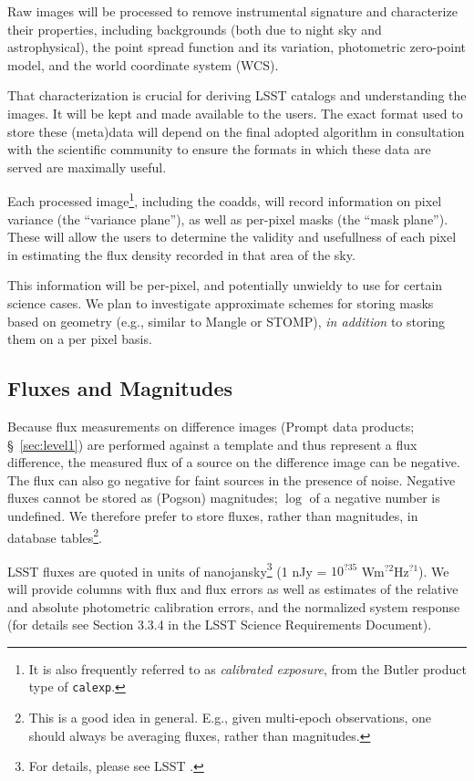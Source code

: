 \documentclass[SE,lsstdraft,toc]{lsstdoc}
\begin{document}
Raw images will be processed to remove instrumental signature and characterize their properties, including backgrounds (both due to night sky and astrophysical), the point spread function and its variation, photometric zero-point model, and the world coordinate system (WCS).

That characterization is crucial for deriving LSST catalogs and understanding the images. It will be kept and made available to the users. The exact format used to store these (meta)data will depend on the final adopted algorithm in consultation with the scientific community to ensure the formats in which these data are served are maximally useful.

Each processed image\footnote{It is also frequently referred to as \emph{calibrated exposure}, from the Butler product type of \texttt{calexp}.}, including the coadds, will record information on pixel variance (the ``variance plane''), as well as per-pixel masks (the ``mask plane''). These will allow the users to determine the validity and  usefullness  of each pixel in estimating the flux density recorded in that area of the sky.

This information will be per-pixel, and potentially unwieldy to use for certain science cases. We plan to investigate approximate schemes for storing masks based on geometry (e.g., similar to Mangle or STOMP), \emph{in addition} to storing them on a per pixel basis.

\subsection{Fluxes and Magnitudes}
\label{sec:fluxes}
Because flux measurements on difference images (Prompt data products; \S~\ref{sec:level1}) are performed against a template
and thus represent a flux difference, the measured flux of a source on the difference image can be negative. The flux can also go negative for faint sources in the presence of noise. Negative fluxes cannot be stored as (Pogson) magnitudes; $\log$ of a negative number is undefined. We therefore prefer to store fluxes, rather than magnitudes, in database tables\footnote{This is a good idea in general. E.g., given multi-epoch observations, one should always be averaging fluxes, rather than magnitudes.}.

LSST fluxes are quoted in units of nanojansky\footnote{For details, please see LSST .} (1 nJy = $10^{?35}$ Wm$^{?2}$Hz$^{?1}$).
We will provide columns with flux and flux errors as well as estimates of the relative and absolute photometric calibration errors, and the normalized system response (for details see Section 3.3.4 in the LSST Science Requirements Document).
\end{document}

